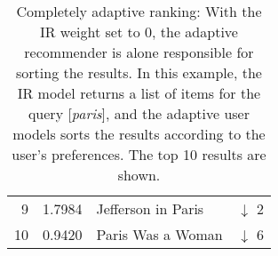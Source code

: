 \begin{table}[t]
\begin{minipage}{0.49\textwidth}
\begin{tabular*}{\textwidth}{ r l l l }
    9 & 1.7984 &  Jefferson in Paris          & \color{red} $\downarrow$ 2 \\
    10& 0.9420 &  Paris Was a Woman           & \color{red} $\downarrow$ 6 \\
    \bottomrule
  \end{tabular*}
  \end{minipage} 
  \vspace{1em}
  \caption[Completely Adaptive Ranking]{
    Completely adaptive ranking: With the IR weight set to $0$,
    the adaptive recommender is alone responsible for sorting the results.
    In this example, the IR model returns a list of items for the query [\emph{paris}],
    and the adaptive user models sorts the results according to the user's preferences.
    The top 10 results are shown.
  }
  \label{table:rank:paris}
\end{table}


